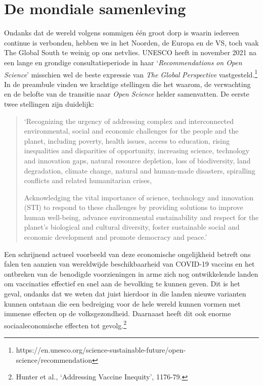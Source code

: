 \documentclass[smallauthor, chapterhaspagenum, nochapterinheader, pagenuminheader,  bigchapnum,medium2, tocpages, garamond, titleinheader]{jote-book}
\begin{document}
	\section{De mondiale samenleving}



	Ondanks dat de wereld volgens sommigen één groot dorp is waarin iedereen continue is verbonden, hebben we in het Noorden, de Europa en de VS, toch vaak The Global South te weinig op ons netvlies. UNESCO heeft in november 2021 na een lange en grondige consultatieperiode in haar ‘\emph{Recommendations}\emph{ on Open }\emph{Science}' misschien wel de beste expressie van \emph{The Global }\emph{Perspective} vastgesteld.\footnote{https://en.unesco.org/science-sustainable-future/open-science/recommendation} In de preambule vinden we krachtige stellingen die het waarom, de verwachting en de belofte van de transitie naar \emph{Open }\emph{Science} helder samenvatten. De eerste twee stellingen zijn duidelijk:

	\begin{quote}
		\itshape

		‘Recognizing the urgency of addressing complex and interconnected environmental, social and economic challenges for the people and the planet, including poverty, health issues, access to education, rising inequalities and disparities of opportunity, increasing science, technology and innovation gaps, natural resource depletion, loss of biodiversity, land degradation, climate change, natural and human-made disasters, spiralling conflicts and related humanitarian crises,

		Acknowledging the vital importance of science, technology and innovation (STI) to respond to these challenges by providing solutions to improve human well-being, advance environmental sustainability and respect for the planet's biological and cultural diversity, foster sustainable social and economic development and promote democracy and peace.'
	\end{quote}

	Een schrijnend actueel voorbeeld van deze economische ongelijkheid betreft ons falen ten aanzien van wereldwijde beschikbaarheid van COVID-19 vaccins en het ontbreken van de benodigde voorzieningen in arme zich nog ontwikkelende landen om vaccinaties effectief en snel aan de bevolking te kunnen geven. Dit is het geval, ondanks dat we weten dat juist hierdoor in die landen nieuwe varianten kunnen ontstaan die een bedreiging voor de hele wereld kunnen vormen met immense effecten op de volksgezondheid. Daarnaast heeft dit ook enorme sociaaleconomische effecten tot gevolg.\footnote{Hunter et al., ‘Addressing Vaccine Inequity', 1176-79. }
\end{document}
